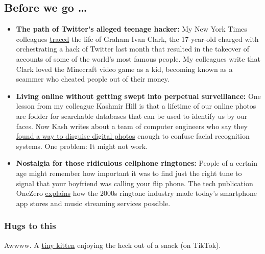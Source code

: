 \hypertarget{before-we-go-}{%
\subsection{Before we go \ldots{}}\label{before-we-go-}}

\begin{itemize}
\item
  \textbf{The path of Twitter's alleged teenage hacker:} My New York
  Times colleagues
  \href{https://www.nytimes3xbfgragh.onion/2020/08/02/technology/florida-teenager-twitter-hack.html}{traced}
  the life of Graham Ivan Clark, the 17-year-old charged with
  orchestrating a hack of Twitter last month that resulted in the
  takeover of accounts of some of the world's most famous people. My
  colleagues write that Clark loved the Minecraft video game as a kid,
  becoming known as a scammer who cheated people out of their money.
\item
  \textbf{Living online without getting swept into perpetual
  surveillance:} One lesson from my colleague Kashmir Hill is that a
  lifetime of our online photos are fodder for searchable databases that
  can be used to identify us by our faces. Now Kash writes about a team
  of computer engineers who say they
  \href{https://www.nytimes3xbfgragh.onion/2020/08/03/technology/fawkes-tool-protects-photos-from-facial-recognition.html}{found
  a way to disguise digital photos} enough to confuse facial recognition
  systems. One problem: It might not work.
\item
  \textbf{Nostalgia for those ridiculous cellphone ringtones:} People of
  a certain age might remember how important it was to find just the
  right tune to signal that your boyfriend was calling your flip phone.
  The tech publication OneZero
  \href{https://onezero.medium.com/how-the-custom-ringtone-industry-paved-the-way-for-the-app-store-and-then-vanished-11f0d2a1e53b}{explains}
  how the 2000s ringtone industry made today's smartphone app stores and
  music streaming services possible.
\end{itemize}

\hypertarget{hugs-to-this}{%
\subsubsection{Hugs to this}\label{hugs-to-this}}

Awwww. A
\href{https://www.tiktok.com/@wags_and_whiskers/video/6848325208785341701}{tiny
kitten} enjoying the heck out of a snack (on TikTok).

